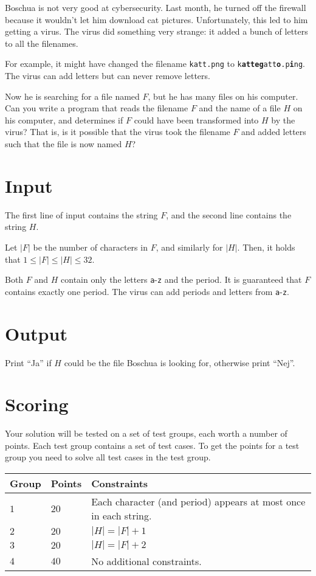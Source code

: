 
Boschua is not very good at cybersecurity. Last month, he turned off the firewall because it wouldn't
let him download cat pictures. Unfortunately, this led to him getting a virus. The virus did something
very strange: it added a bunch of letters to all the filenames.

For example, it might have changed the filename \texttt{katt.png} to \texttt{k\textbf{atteg}att\textbf{o}.p\textbf{i}ng}.
The virus can add letters but can never remove letters.

Now he is searching for a file named $F$, but he has many files on his computer. Can you write a
program that reads the filename $F$ and the name of a file $H$ on his computer, and determines if
$F$ could have been transformed into $H$ by the virus? That is, is it possible that the virus took
the filename $F$ and added letters such that the file is now named $H$?

\section*{Input}
The first line of input contains the string $F$, and the second line contains the string $H$.

Let $|F|$ be the number of characters in $F$, and similarly for $|H|$.
Then, it holds that $1 \le |F| \le |H| \le 32$.

Both $F$ and $H$ contain only the letters \texttt{a}-\texttt{z} and the period.
It is guaranteed that $F$ contains exactly one period. The virus can add periods and letters from \texttt{a}-\texttt{z}.

\section*{Output}  
Print ``Ja'' if $H$ could be the file Boschua is looking for, otherwise print ``Nej''.

\section*{Scoring}
Your solution will be tested on a set of test groups, each worth a number of points. Each test group contains
a set of test cases. To get the points for a test group you need to solve all test cases in the test group.

\noindent
\begin{tabular}{| l | l | p{12cm} |}
  \hline
  \textbf{Group} & \textbf{Points} & \textbf{Constraints} \\ \hline
  $1$ & $20$ & Each character (and period) appears at most once in each string. \\ \hline
  $2$ & $20$ & $|H| = |F|+1$ \\ \hline
  $3$ & $20$ & $|H| = |F|+2$ \\ \hline
  $4$ & $40$ & No additional constraints. \\ \hline
\end{tabular}

